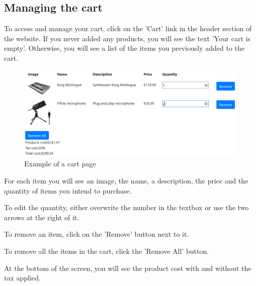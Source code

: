\subsection{Managing the cart}
To access and manage your cart, click on the 'Cart' link in the header section of the website. If you never added any products, you will see the text 'Your cart is empty'. Otherwise, you will see a list of the items you previously added to the cart.

\begin{figure}[H]
\centering
\includegraphics[scale=0.6]{res/Immagini/CartPage}
\caption{Example of a cart page}
\end{figure}

For each item you will see an image, the name, a description, the price and the quantity of items you intend to purchase.

To edit the quantity, either overwrite the number in the textbox or use the two arrows at the right of it. 

To remove an item, click on the 'Remove' button next to it. 

To remove all the items in the cart, click the 'Remove All' button.

At the bottom of the screen, you will see the product cost with and without the tax applied.